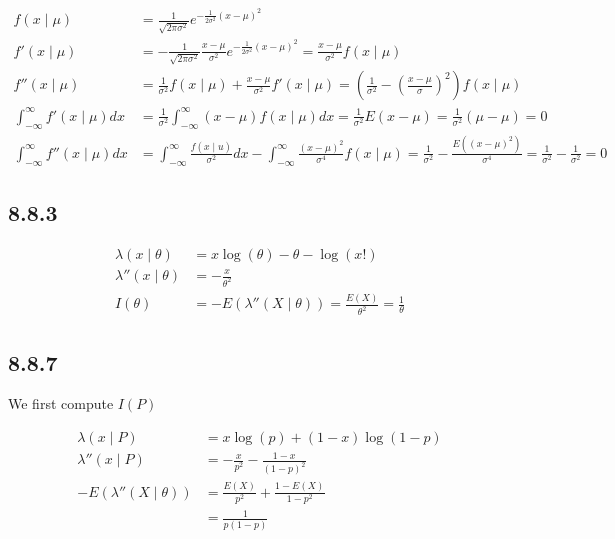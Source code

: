 \documentclass[12pt,letterpaper]{article}
\theoremstyle{definition}
\begin{document}
\begin{align*}
  f(x \mid \mu) &= \frac{1}{\sqrt{2\pi \sigma^2}}e^{-\frac{1}{2\sigma^2}(x-\mu)^2} \\
  f'(x \mid \mu) &= -\frac{1}{\sqrt{2\pi \sigma^2}}\frac{x-\mu}{\sigma^2}e^{-\frac{1}{2\sigma^2}(x-\mu)^2} = \frac{x-\mu}{\sigma^2}f(x\mid \mu)\\
  f''(x \mid \mu) &= \frac{1}{\sigma^2}f(x \mid \mu) + \frac{x-\mu}{\sigma^2} f'(x\mid \mu) = \left( \frac{1}{\sigma^2}  - \left(\frac{x - \mu }{\sigma}\right)^2\right)f(x \mid \mu) \\
  \int_{-\infty}^\infty f'(x \mid \mu)dx &= \frac{1}{\sigma^2}\int_{-\infty}^\infty(x-\mu)f(x \mid \mu)dx = \frac{1}{\sigma^2}E(x - \mu) = \frac{1}{\sigma^2}(\mu - \mu) = 0 \\
  \int_{-\infty}^\infty f''(x \mid \mu)dx &= \int_{-\infty}^\infty \frac{f(x\mid u)}{\sigma^2}dx - \int_{-\infty}^\infty \frac{(x-\mu)^2}{\sigma^4}f(x \mid \mu) = \frac{1}{\sigma^2} - \frac{E((x-\mu)^2)}{\sigma^4} = \frac{1}{\sigma^2} - \frac{1}{\sigma^2} = 0
\end{align*}

\subsection*{8.8.3}

\begin{align*}
  \lambda(x \mid \theta) &= x\log(\theta) -\theta - \log(x!) \\
  \lambda''(x \mid \theta) &= -\frac{x}{\theta^2} \\
  I(\theta) &= -E(\lambda''(X \mid \theta)) = \frac{E(X)}{\theta^2} = \frac{1}{\theta}
\end{align*}

\subsection*{8.8.7}

We first compute $I(P)$

\begin{align*}
  \lambda(x \mid P) &= x\log(p) + (1-x)\log(1-p) \\
  \lambda''(x \mid P) &= -\frac{x}{p^2} - \frac{1-x}{(1-p)^2} \\
  -E(\lambda''(X \mid \theta)) &= \frac{E(X)}{p^2} + \frac{1-E(X)}{1-p^2} \\
                    &= \frac{1}{p(1-p)}
\end{align*}
\end{document}
